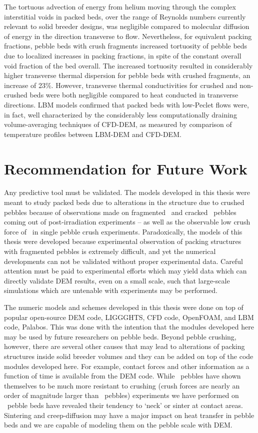 The tortuous advection of energy from helium moving through the complex interstitial voids in packed beds, over the range of Reynolds numbers currently relevant to solid breeder designs, was negligible compared to molecular diffusion of energy in the direction transverse to flow. Nevertheless, for equivalent packing fractions, pebble beds with crush fragments increased tortuosity of pebble beds due to localized increases in packing fractions, in spite of the constant overall void fraction of the bed overall. The increased tortuosity resulted in considerably higher transverse thermal dispersion for pebble beds with crushed fragments, an increase of 23\%. However, transverse thermal conductivities for crushed and non-crushed beds were both negligible compared to heat conducted in transverse directions. LBM models confirmed that packed beds with low-Peclet flows were, in fact, well characterized by the considerably less computationally draining volume-averaging techniques of CFD-DEM, as measured by comparison of temperature profiles between LBM-DEM and CFD-DEM.

\section{Recommendation for Future Work}

Any predictive tool must be validated. The models developed in this thesis were meant to study packed beds due to alterations in the structure due to crushed pebbles because of observations made on fragmented \lis~and cracked \lit~pebbles coming out of post-irradiation experiments -- as well as the observable low crush force of \lis~in single pebble crush experiments. Paradoxically, the models of this thesis were developed because experimental observation of packing structures with fragmented pebbles is extremely difficult, and yet the numerical developments can not be validated without proper experimental data. Careful attention must be paid to experimental efforts which may yield data which can directly validate DEM results, even on a small scale, such that large-scale simulations which are untenable with experiments may be performed. 

The numeric models and schemes developed in this thesis were done on top of popular open-source DEM code, LIGGGHTS, CFD code, OpenFOAM, and LBM code, Palabos. This was done with the intention that the modules developed here may be used by future researchers on pebble beds. Beyond pebble crushing, however, there are several other causes that may lead to alterations of packing structures inside solid breeder volumes and they can be added on top of the code modules developed here. For example, contact forces and other information as a function of time is available from the DEM code. While \lit~pebbles have shown themselves to be much more resistant to crushing (crush forces are nearly an order of magnitude larger than \lis~pebbles) experiments we have performed on \lit~pebble beds have revealed their tendency to `neck' or sinter at contact areas. Sintering and creep-diffusion may have a major impact on heat transfer in pebble beds and we are capable of modeling them on the pebble scale with DEM. 


